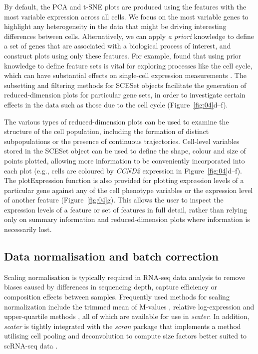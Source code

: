 \documentclass[10pt,letterpaper]{article}
\begin{document}
By default, the PCA and t-SNE plots are produced using the features with
the most variable expression across all cells. We focus on the most variable genes to highlight any
heterogeneity in the data that might be driving interesting differences between
cells. Alternatively, we can apply \emph{a priori} knowledge to define a set of
genes that are associated with a biological process of interest, and construct
plots using only these features. For example, \citet{Scialdone2015-gj}
found that using prior knowledge to define feature sets is vital for
exploring processes like the cell cycle, which can have substantial effects on
single-cell expression measurements \citep{Buettner2015-jg}. The subsetting and
filtering methods for SCESet objects facilitate the generation of
reduced-dimension plots for particular gene sets, in order to
investigate certain effects in the data such as those due to the cell
cycle (Figure~\ref{fig:04}d--f).

The various types of reduced-dimension plots can be used to examine the structure of the cell population, including the formation of distinct subpopulations or the presence of continuous trajectories. Cell-level variables stored in the
SCESet object can be used to define the shape, colour and size of points
plotted, allowing more information to be conveniently incorporated into
each plot (e.g., cells are coloured by \emph{CCND2} expression in
Figure~\ref{fig:04}d--f). The plotExpression function is also provided for
plotting expression levels of a particular gene against any of the cell
phenotype variables or the expression level of
another feature (Figure~\ref{fig:04}g). This allows the user to inspect the expression levels
of a feature or set of features in full detail, rather than relying only
on summary information and reduced-dimension plots where information is
necessarily lost.



\subsection*{Data normalisation and batch correction} \label{data-normalisation-and-batch-correction}

Scaling normalisation is typically required in RNA-seq data analysis to remove biases caused by differences in sequencing depth, capture efficiency or composition effects between samples. Frequently used methods for scaling normalization include the trimmed mean of M-values \citep{Robinson2010-dy}, relative log-expression \citep{Anders2010-kv} and upper-quartile methods \citep{Bullard2010-ui}, all of which are available for use in \emph{scater}. In addition, \emph{scater} is tightly integrated with the \emph{scran} package that implements a method utilising cell pooling and deconvolution to compute size factors better suited to scRNA-seq data \citep{Lun2016-sk}.
\end{document}
